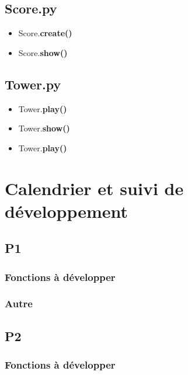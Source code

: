 \documentclass[a4paper]{article}
\begin{document}
        \subsection{Score.py}
            \begin{itemize}
                \item Score.\textbf{create()}
                \item Score.\textbf{show()}
            \end{itemize}

        \subsection{Tower.py}
            \begin{itemize}
                \item Tower.\textbf{play()}
                \item Tower.\textbf{show()}
                \item Tower.\textbf{play()}
            \end{itemize}

    \section{Calendrier et suivi de développement}
        \subsection{P1}
            \subsubsection{Fonctions à développer}
            \subsubsection{Autre}
        \subsection{P2}
            \subsubsection{Fonctions à développer}
\end{document}
